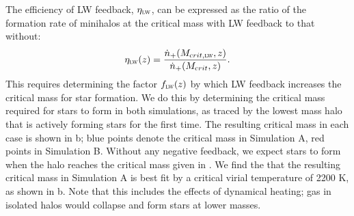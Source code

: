 \documentclass[../thesis.tex]{subfiles}
\begin{document}
The efficiency of LW feedback, $\eta_{\textsc{lw}}$, can be expressed
as the ratio of the formation rate of minihalos at the critical mass
with LW feedback to that without:
\begin{equation}
  \eta_{\textsc{lw}}(z) = \frac{ \dot{n}_{+}(M_{\mathrm crit, \textsc{lw}},
    z) }{ \dot{n}_{+}(M_{\mathrm crit}, z)}.
\end{equation}
This requires determining the factor $f_{\textsc{lw}}(z)$ by which LW
feedback increases the critical mass for star formation.  We do this
by determining the critical mass required for stars to form in both
simulations, as traced by the lowest mass halo that is actively
forming stars for the first time.  The resulting critical mass in each
case is shown in b; blue points denote the critical
mass in Simulation A, red points in Simulation B.  Without any
negative feedback, we expect stars to form when the halo reaches the
critical mass given in .  We find the that the resulting critical
mass in Simulation A is best fit by a critical virial temperature of
2200 K, as shown in b.  Note that this includes the
effects of dynamical heating; gas in isolated halos would collapse and
form stars at lower masses.
\end{document}
